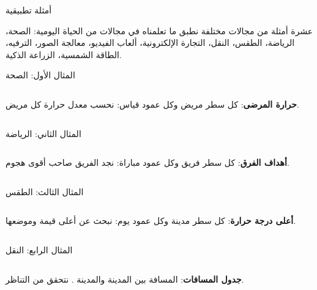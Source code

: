 \begin{frame}{أمثلة تطبيقية}
    \begin{tbox}{\faLaptopCode\quad عشرة أمثلة من مجالات مختلفة}
        نطبق ما تعلمناه في مجالات من الحياة اليومية:
        الصحة، الرياضة، الطقس، النقل، التجارة الإلكترونية، ألعاب الفيديو، معالجة الصور، الترفيه، الطاقة الشمسية، الزراعة الذكية.
    \end{tbox}
\end{frame}

\begin{frame}[t]{المثال الأول: الصحة}
    \begin{columns}[T]
        {\small\textbf{حرارة المرضى}: كل سطر مريض وكل عمود قياس: نحسب معدل حرارة كل مريض.\par}
        \vspace{0.3cm}
    \end{columns}
\end{frame}

\begin{frame}[t]{المثال الثاني: الرياضة}
    \begin{columns}[T]
        {\small\textbf{أهداف الفرق}: كل سطر فريق وكل عمود مباراة: نجد الفريق صاحب أقوى هجوم.\par}
        \vspace{0.3cm}
    \end{columns}
\end{frame}

\begin{frame}[t]{المثال الثالث: الطقس}
    \begin{columns}[T]
        {\small\textbf{أعلى درجة حرارة}: كل سطر مدينة وكل عمود يوم: نبحث عن أعلى قيمة وموضعها.\par}
        \vspace{0.3cm}
    \end{columns}
\end{frame}

\begin{frame}[t]{المثال الرابع: النقل}
    \begin{columns}[T]
        {\small\textbf{جدول المسافات}:  المسافة بين المدينة  والمدينة . نتحقق من التناظر.\par}
        \vspace{0.3cm}
    \end{columns}
\end{frame}

